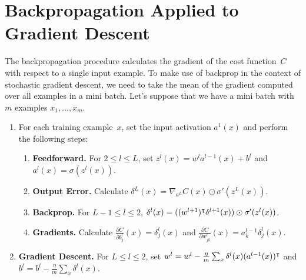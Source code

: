 \section{Backpropagation Applied to Gradient Descent} 

The backpropagation procedure calculates the gradient of the cost 
function~$C$ with respect to a single input example. To make use of 
backprop in the context of stochastic gradient descent, we need to take 
the mean of the gradient computed over all examples in a mini batch. 
Let's suppose that we have a mini batch with $m$ examples 
$x_1, \ldots, x_m$.
\begin{enumerate}
    \item For each training example~$x$, set the input activation
        $a^1 (x)$ and perform the following steps:
        \begin{enumerate}
            \item \textbf{Feedforward.} For $2 \leq l \leq L$, set 
                $z^l (x) = w^l a^{l - 1} (x) + b^l$ and 
                $a^l (x) = \sigma (z^l (x))$.
            \item \textbf{Output Error.} Calculate 
                $\delta^L (x) = \nabla_{a^L} C(x) \odot \sigma' (z^L (x) )$.
            \item \textbf{Backprop.} For $L - 1 \leq l \leq 2$, 
                $\delta^l (x) = ( (w^{l + 1})^{\intercal} \delta^{l + 1} (x) ) 
                                    \odot \sigma' (z^l (x))$.
            \item \textbf{Gradients.} Calculate 
            $ \frac{\partial C}{\partial b_j^{l}} (x) = \delta_{j}^l (x)$
            and $\frac{\partial C}{\partial w_{j k}^l} (x) 
                    = a_{k}^{l - 1} \delta_{j}^l (x)$.
        \end{enumerate}
    \item \textbf{Gradient Descent.} For $L \leq l \leq 2$, set 
        $w^l = w^l - \frac{\eta}{m} \sum_{x} \delta^{l} (x) (a^{l - 1} (x))^{\intercal}$
        and
        $b^l = b^l - \frac{\eta}{m} \sum_{x} \delta^l (x)$.
\end{enumerate}
